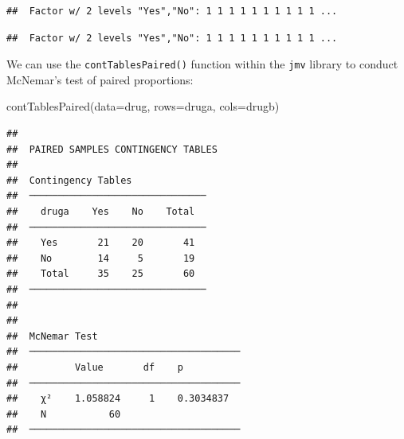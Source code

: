 \documentclass[
]{memoir}
\newenvironment{Shaded}{\begin{snugshade}}{\end{snugshade}}
\newcommand{\AttributeTok}[1]{\textcolor[rgb]{0.77,0.63,0.00}{#1}}
\newcommand{\FunctionTok}[1]{\textcolor[rgb]{0.00,0.00,0.00}{#1}}
\newcommand{\NormalTok}[1]{#1}
\newcommand{\OtherTok}[1]{\textcolor[rgb]{0.56,0.35,0.01}{#1}}
\newcommand{\SpecialCharTok}[1]{\textcolor[rgb]{0.00,0.00,0.00}{#1}}
\newcommand{\StringTok}[1]{\textcolor[rgb]{0.31,0.60,0.02}{#1}}
\begin{document}
\begin{Shaded}
\end{Shaded}

\begin{verbatim}
##  Factor w/ 2 levels "Yes","No": 1 1 1 1 1 1 1 1 1 1 ...
\end{verbatim}

\begin{Shaded}
\end{Shaded}

\begin{verbatim}
##  Factor w/ 2 levels "Yes","No": 1 1 1 1 1 1 1 1 1 1 ...
\end{verbatim}

We can use the \texttt{contTablesPaired()} function within the \texttt{jmv} library to conduct McNemar's test of paired proportions:

\begin{Shaded}
\begin{Highlighting}[]
\FunctionTok{contTablesPaired}\NormalTok{(}\AttributeTok{data=}\NormalTok{drug, }\AttributeTok{rows=}\NormalTok{druga, }\AttributeTok{cols=}\NormalTok{drugb)}
\end{Highlighting}
\end{Shaded}

\begin{verbatim}
## 
##  PAIRED SAMPLES CONTINGENCY TABLES
## 
##  Contingency Tables              
##  ─────────────────────────────── 
##    druga    Yes    No    Total   
##  ─────────────────────────────── 
##    Yes       21    20       41   
##    No        14     5       19   
##    Total     35    25       60   
##  ─────────────────────────────── 
## 
## 
##  McNemar Test                          
##  ───────────────────────────────────── 
##          Value       df    p           
##  ───────────────────────────────────── 
##    χ²    1.058824     1    0.3034837   
##    N           60                      
##  ─────────────────────────────────────
\end{verbatim}
\end{document}
